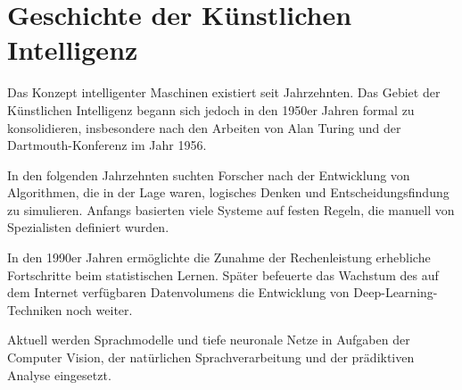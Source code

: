 \section{Geschichte der Künstlichen Intelligenz}

Das Konzept intelligenter Maschinen existiert seit Jahrzehnten. Das Gebiet der Künstlichen
Intelligenz begann sich jedoch in den 1950er Jahren formal zu konsolidieren, insbesondere nach den
Arbeiten von Alan Turing und der Dartmouth-Konferenz im Jahr 1956.

In den folgenden Jahrzehnten suchten Forscher nach der Entwicklung von Algorithmen, die in der Lage waren,
logisches Denken und Entscheidungsfindung zu simulieren. Anfangs basierten viele Systeme auf
festen Regeln, die manuell von Spezialisten definiert wurden.

In den 1990er Jahren ermöglichte die Zunahme der Rechenleistung erhebliche Fortschritte beim
statistischen Lernen. Später befeuerte das Wachstum des auf dem Internet verfügbaren Datenvolumens
die Entwicklung von Deep-Learning-Techniken noch weiter.

Aktuell werden Sprachmodelle und tiefe neuronale Netze in Aufgaben der Computer Vision,
der natürlichen Sprachverarbeitung und der prädiktiven Analyse eingesetzt.
 